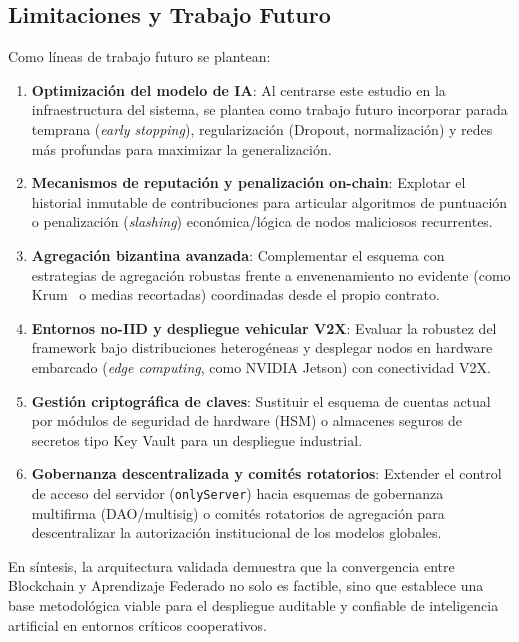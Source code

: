 \subsection{Limitaciones y Trabajo Futuro}
Como líneas de trabajo futuro se plantean:
\begin{enumerate}
    \item \textbf{Optimización del modelo de IA}: Al centrarse este estudio en la infraestructura del sistema, se plantea como trabajo futuro incorporar parada temprana (\textit{early stopping}), regularización (Dropout, normalización) y redes más profundas para maximizar la generalización.
    \item \textbf{Mecanismos de reputación y penalización on-chain}: Explotar el historial inmutable de contribuciones para articular algoritmos de puntuación o penalización (\textit{slashing}) económica/lógica de nodos maliciosos recurrentes.
    \item \textbf{Agregación bizantina avanzada}: Complementar el esquema con estrategias de agregación robustas frente a envenenamiento no evidente (como Krum~\cite{blanchard2017byzantine} o medias recortadas) coordinadas desde el propio contrato.
    \item \textbf{Entornos no-IID y despliegue vehicular V2X}: Evaluar la robustez del framework bajo distribuciones heterogéneas y desplegar nodos en hardware embarcado (\textit{edge computing}, como NVIDIA Jetson) con conectividad V2X.
    \item \textbf{Gestión criptográfica de claves}: Sustituir el esquema de cuentas actual por módulos de seguridad de hardware (HSM) o almacenes seguros de secretos tipo Key Vault para un despliegue industrial.
    \item \textbf{Gobernanza descentralizada y comités rotatorios}: Extender el control de acceso del servidor (\texttt{onlyServer}) hacia esquemas de gobernanza multifirma (DAO/multisig) o comités rotatorios de agregación para descentralizar la autorización institucional de los modelos globales.
\end{enumerate}
En síntesis, la arquitectura validada demuestra que la convergencia entre Blockchain y Aprendizaje Federado no solo es factible, sino que establece una base metodológica viable para el despliegue auditable y confiable de inteligencia artificial en entornos críticos cooperativos.

